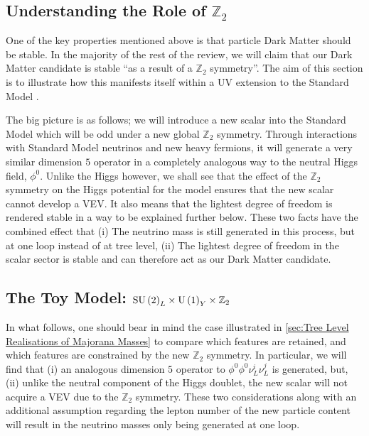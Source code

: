 \documentclass[10pt]{article}
\begin{document}
\subsection{Understanding the Role of $\mathbb{Z}_2$}\label{sec:understanding Z2}
One of the key properties mentioned above is that particle Dark Matter should be stable. In the majority of the rest of the review, we will claim that our Dark Matter candidate is stable ``as a result of a $\mathbb{Z}_2$ symmetry''. The aim of this section is to illustrate how this manifests itself within a UV extension to the Standard Model \cite{Ma2006a, Kubo2006, Ma2006, Ma2001}.

The big picture is as follows; we will introduce a new scalar into the Standard Model which will be odd under a new global $\mathbb{Z}_2$ symmetry. Through interactions with Standard Model neutrinos and new heavy fermions, it will generate a very similar dimension $5$ operator in a completely analogous way to the neutral Higgs field, $\phi^0$. Unlike the Higgs however, we shall see that the effect of the $\mathbb{Z}_2$ symmetry on the Higgs potential for the model ensures that the new scalar cannot develop a VEV. It also means that the lightest degree of freedom is rendered stable in a way to be explained further below. These two facts have the combined effect that (i) The neutrino mass is still generated in this process, but at one loop instead of at tree level, (ii) The lightest degree of freedom in the scalar sector is stable and can therefore act as our Dark Matter candidate.
\subsection{The Toy Model: $\textrm{SU}\left(2\right)_L \times \textrm{U}\left(1\right)_Y \times \mathbb{Z}_2$}
In what follows, one should bear in mind the case illustrated in \ref{sec:Tree Level Realisations of Majorana Masses} to compare which features are retained, and which features are constrained by the new $\mathbb{Z}_2$ symmetry. In particular, we will find that (i) an analogous dimension $5$ operator to $\phi^0 \phi^0 \nu^i_L \nu^j_L$ is generated, but, (ii) unlike the neutral component of the Higgs doublet, the new scalar will not acquire a VEV due to the $\mathbb{Z}_2$ symmetry. These two considerations along with an additional assumption regarding the lepton number of the new particle content will result in the neutrino masses only being generated at one loop.
\end{document}
